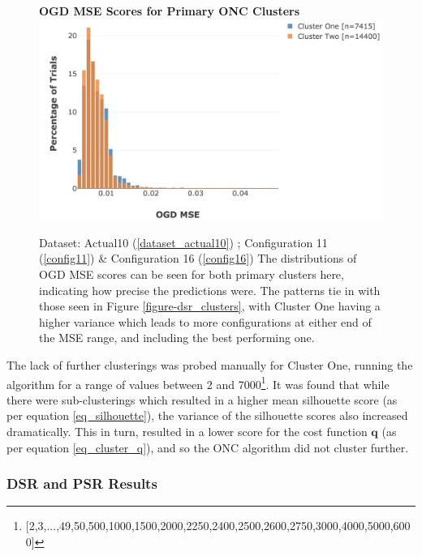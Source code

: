 \documentclass[a4paper,11pt,oneside]{article}
\theoremstyle{plain}
\theoremstyle{definition}
\begin{document}
	\begin{figure}[H]
		\centering
		\textbf{OGD MSE Scores for Primary ONC Clusters}
		\includegraphics[scale=0.45]{images/results/8_10_dsr/cluster_distributions_mse.png} 
		\caption[OGD MSE Scores for Primary ONC Clusters]{Dataset: Actual10 (\ref{dataset_actual10}) ; Configuration 11 (\ref{config11}) \&  Configuration 16 (\ref{config16})
			\newline The distributions of OGD MSE scores can be seen for both primary clusters here, indicating how precise the predictions were. The patterns tie in with those seen in Figure \ref{figure-dsr_clusters}, with Cluster One having a higher variance which leads to more configurations at either end of the MSE range, and including the best performing one.}
		\label{figure-dsr_clusters_mse}
	\end{figure}
	
	The lack of further clusterings was probed manually for Cluster One, running the algorithm for a range of values between 2 and 7000\footnote{[2,3,...,49,50,500,1000,1500,2000,2250,2400,2500,2600,2750,3000,4000,5000,6000]}. It was found that while there were sub-clusterings which resulted in a higher mean silhouette score (as per equation \eqref{eq_silhouette}), the variance of the silhouette scores also increased dramatically. This in turn, resulted in a lower score for the cost function $\mathbf{q}$ (as per equation \eqref{eq_cluster_q}), and so the ONC algorithm did not cluster further.
	
	\subsubsection{DSR and PSR Results}\label{results_dsr2}
	
\end{document}
